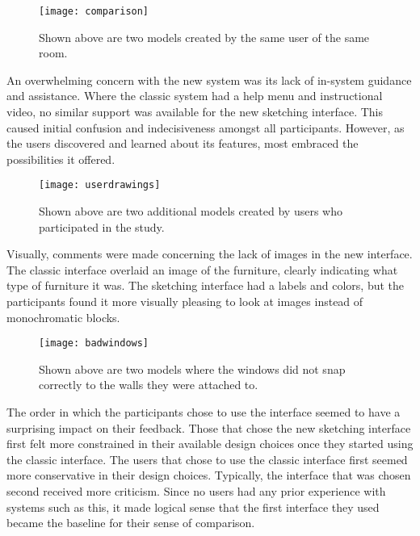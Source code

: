 \begin{figure}[ht]
\centering
\texttt{[image: comparison]}
\caption[Comparison of user designed models]{Shown above are two models created by the same user of the same room.}
\label{fig:comparison}
\end{figure}

An overwhelming concern with the new system was its lack of in-system guidance and assistance. Where the classic system had a help menu and instructional video, no similar support was available for the new sketching interface. This caused initial confusion and indecisiveness amongst all participants. However, as the users discovered and learned about its features, most embraced the possibilities it offered.

\begin{figure}[ht]
\centering
\texttt{[image: userdrawings]}
\caption[Additional user created drawings for the pilot study]{Shown above are two additional models created by users who participated in the study.}
\label{fig:moredrawings}
\end{figure}

Visually, comments were made concerning the lack of images in the new interface. The classic interface overlaid an image of the furniture, clearly indicating what type of furniture it was. The sketching interface had a labels and colors, but the participants found it more visually pleasing to look at images instead of monochromatic blocks. \\

\begin{figure}[ht]
\centering
\texttt{[image: badwindows]}
\caption[Examples of windows not snapping correctly]{Shown above are two models where the windows did not snap correctly to the walls they were attached to.}
\label{fig:badwindows}
\end{figure}

The order in which the participants chose to use the interface seemed to have a surprising impact on their feedback. Those that chose the new sketching interface first felt more constrained in their available design choices once they started using the classic interface. The users that chose to use the classic interface first seemed more conservative in their design choices. Typically, the interface that was chosen second received more criticism. Since no users had any prior experience with systems such as this, it made logical sense that the first interface they used became the baseline for their sense of comparison.


